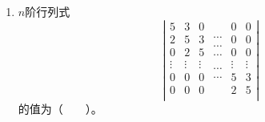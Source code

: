 \begin{enumerate}[1~]
\begin{enumerate}[1.~]
\item 
$n$阶行列式
$$\left| \begin{array}{c}
	5\\
	2\\
	0\\
	\vdots\\
	0\\
	0\\
\end{array}\begin{array}{c}
	3\\
	5\\
	2\\
	\vdots\\
	0\\
	0\\
\end{array}\begin{array}{c}
	0\\
	3\\
	5\\
	\vdots\\
	0\\
	0\\
\end{array}\begin{array}{c}
	\cdots\\
	\cdots\\
	\cdots\\
	\\
	\cdots\\
	\cdots\\
\end{array}\begin{array}{c}
	0\\
	0\\
	0\\
	\vdots\\
	5\\
	2\\
\end{array}\begin{array}{c}
	0\\
	0\\
	0\\
	\vdots\\
	3\\
	5\\
\end{array} \right|
$$
的值为（\ \ \ \ ）。


\end{enumerate}
\end{enumerate}
